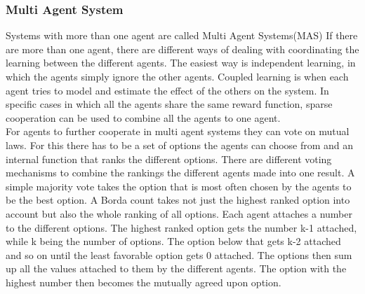 \documentclass[a4paper]{article}
\begin{document}
\subsubsection{Multi Agent System}
Systems with more than one agent are called Multi Agent Systems(MAS)
If there are more than one agent, there are different ways of dealing with coordinating the learning between the different agents. The easiest way is independent learning, in which the agents simply ignore the other agents. Coupled learning is when each agent tries to model and estimate the effect of the others on the system. In specific cases in which all the agents share the same reward function, sparse cooperation can be used to combine all the agents to one agent.\cite{multiagent}\\
For agents to further cooperate in multi agent systems they can vote on mutual laws.  For this there has to be a set of options the agents can choose from and an internal function that ranks the different options. 
There are different voting mechanisms to combine the rankings the different agents made into one result. A simple majority vote takes the option that is most often chosen by the  agents to be the best option. A Borda count takes not just the highest ranked option into account but also the whole ranking of all options. Each agent attaches a number to the different options. The highest ranked option gets the number k-1 attached, while k being the number of options. The option below that gets k-2 attached and so on until the least favorable option gets 0 attached. The options then sum up all the values attached to them by the different agents. The option with the highest number then becomes the mutually agreed upon option.\cite{mas}
\end{document}
